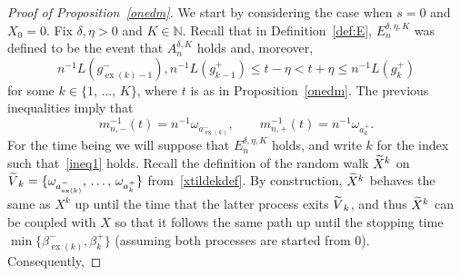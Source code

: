 \documentclass[AHL,Unicode,longabstracts,published]{cedram}
\newcommand{\N}{\mathbb N}
\newcommand\ex{\operatorname{ex}}
\newcommand{\aat}[1]{a_{\ex(#1)}^-}
\newcommand{\gtt}[1]{g_{\ex(#1)-1}^-}
\newcommand{\betat}[1]{\beta^-_{\ex(#1)}}
\let\oldtilde\tilde
\renewcommand*{\tilde}[1]{\mathchoice{\widetilde{#1}}{\widetilde{#1}}{\oldtilde{#1}}{\oldtilde{#1}}}
\begin{document}
\begin{proof}[Proof of Proposition~\ref{onedm}] We start by considering the case when $s=0$ and $X_0=0$. Fix $\delta,\eta>0$ and $K\in\N$. Recall that in Definition~\ref{def:E}, $E_n^{\delta,\eta,K}$ was defined to be the event that $A_n^{\delta,K}$ holds and, moreover,
\begin{equation}\label{ineq1}
n^{-1}L\left(\gtt{k}\right),n^{-1}L\left(g_{k-1}^+\right)\leq t-\eta<t+\eta\leq n^{-1}L\left(g_{k}^+\right)
\end{equation}
for some $k\in\{1,\,\dots,\,K\}$, where $t$ is as in Proposition~\ref{onedm}. The previous inequalities imply that
\begin{equation}\label{ddddd}
m_{n,-}^{-1}(t)=n^{-1}\omega_{\aat{k}},\qquad m_{n,+}^{-1}(t)=n^{-1}\omega_{a_k^+}.
\end{equation}
For the time being we will suppose that $E_n^{\delta,\eta,K}$ holds, and write $k$ for the index such that~\eqref{ineq1} holds. Recall the definition of the random walk $\tilde{X}^k$ on $\tilde{V}_k=\{\omega_{\aat{k}},\,\dots,\,\omega_{a_k^+}\}$ from~\eqref{xtildekdef}. By construction, $\tilde{X}^k$ behaves the same as $X^k$ up until the time that the latter process exits $\tilde{V}_k$, and thus $\tilde{X}^k$ can be coupled with $X$ so that it follows the same path up until the stopping time $\min\{\betat{k},{\beta}_k^+\}$ (assuming both processes are started from 0). Consequently,


\end{proof}
\end{document}
